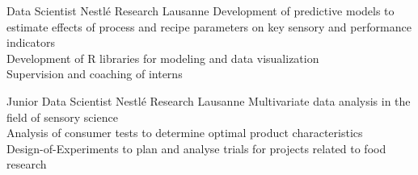\documentclass{yalcv}
\begin{document}
\begin{cvbody}
    {Data Scientist}
    {Nestlé Research Lausanne}
    {Development of predictive models to estimate effects of process and recipe parameters on
        key sensory and performance indicators\\
        Development of R libraries for modeling and data visualization\\
        Supervision and coaching of interns}

    {Junior Data Scientist}
    {Nestlé Research Lausanne}
    {Multivariate data analysis in the field of sensory science\\
        Analysis of consumer tests to determine optimal product characteristics\\
        Design-of-Experiments to plan and analyse trials for projects related to food research}
\end{cvbody}
\end{document}
